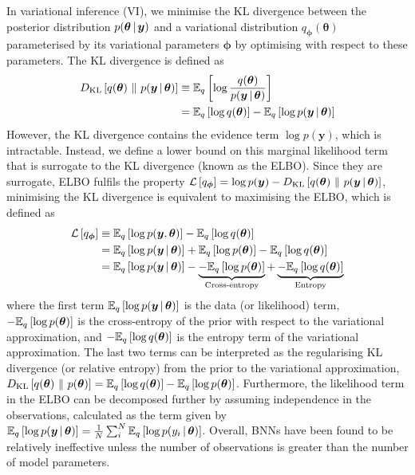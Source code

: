 In variational inference (VI), we minimise the KL divergence between the posterior distribution \(p(\bm \theta \, | \, \bm y)\) and a variational distribution \(q_{\bm \phi}(\bm \theta)\) parameterised by its variational parameters \(\bm \phi\) by optimising with respect to these parameters.
The KL divergence is defined as
\begin{align}
    D_{\mathrm{KL}}\left[q(\bm \theta)\ \lVert\ p(\bm y \, | \, \bm \theta)\right] \equiv{} & \mathbb{E}_{q}\left[\log \frac{q(\bm \theta)}{p(\bm y \, | \, \bm \theta)}\right] \label{eq:kld}  \\
    ={}                                                      & \mathbb{E}_{q}\left[\log q(\bm \theta)\right] - \mathbb{E}_{q}\left[\log p(\bm y \, | \, \bm \theta)\right] \nonumber
\end{align}
However, the KL divergence contains the evidence term \(\log p(\bm y)\), which is intractable.
Instead, we define a lower bound on this marginal likelihood term that is surrogate to the KL divergence (known as the ELBO).
Since they are surrogate, ELBO fulfils the property \(\mathcal{L}\left[q_{\bm \phi}\right] = \log p(\bm y) - D_{\mathrm{KL}}\left[q(\bm \theta)\ \lVert\ p(\bm y \, | \, \bm \theta)\right]\), minimising the KL divergence is equivalent to maximising the ELBO, which is defined as
\begin{align}
    \mathcal{L}\left[q_{\bm \phi}\right] \equiv{} & \mathbb{E}_{q}\left[\log p(\bm y, \bm \theta)\right] - \mathbb{E}_{q}\left[\log q(\bm \theta)\right] \nonumber                                                                                                               \\
    ={}            & \mathbb{E}_{q}\left[\log p(\bm y \, | \, \bm \theta)\right] + \mathbb{E}_{q}\left[\log p(\bm \theta)\right] - \mathbb{E}_{q}\left[\log q(\bm \theta)\right] \nonumber                                                                             \\
    ={}            & \mathbb{E}_{q}\left[\log p(\bm y \, | \, \bm \theta)\right] - \underbrace{- \mathbb{E}_{q}\left[\log p(\bm \theta)\right]}_{\text{Cross-entropy}} + \underbrace{- \mathbb{E}_{q}\left[\log q(\bm \theta)\right]}_{\text{Entropy}} \label{eq:elbo}
\end{align}
where the first term \(\mathbb{E}_{q}\left[\log p(\bm y \, | \, \bm \theta)\right]\) is the data (or likelihood) term, \(-\mathbb{E}_{q}\left[\log p(\bm \theta)\right]\) is the cross-entropy of the prior with respect to the variational approximation, and \(-\mathbb{E}_{q}\left[\log q(\bm \theta)\right]\) is the entropy term of the variational approximation.
The last two terms can be interpreted as the regularising KL divergence (or relative entropy) from the prior to the variational approximation, \(D_{\mathrm{KL}}\left[q(\bm \theta)\ \lVert\ p(\bm \theta)\right] = \mathbb{E}_{q}\left[\log q(\bm \theta)\right] - \mathbb{E}_{q}\left[\log p(\bm \theta)\right]\).
Furthermore, the likelihood term in the ELBO can be decomposed further by assuming independence in the observations, calculated as the term given by \(\mathbb{E}_{q}\left[\log p(\bm y \, | \, \bm \theta)\right] = \frac{1}{N} \sum^N_i \mathbb{E}_{q}\left[\log p(y_i \, | \, \bm \theta)\right]\).
Overall, BNNs have been found to be relatively ineffective unless the number of observations is greater than the number of model parameters.

